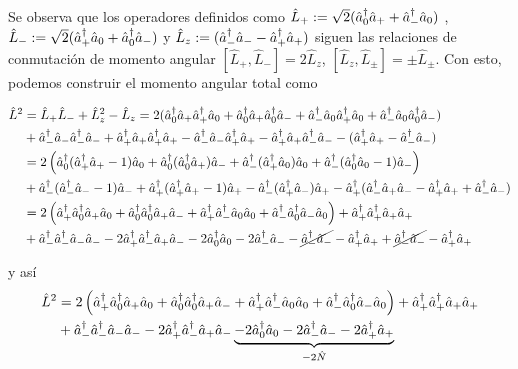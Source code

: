 Se observa que los operadores definidos como $\hat{L}_+ := \sqrt{2}( \crea{0}\anni{+} + \crea{-}\anni{0})$ , $\hat{L}_- := \sqrt{2}( \crea{+}\anni{0} + \crea{0}\anni{-})$ y $\hat{L}_z := ( \crea{-}\anni{-} - \crea{+}\anni{+})$ siguen las relaciones de conmutación de momento angular $\left[ \hat{L}_+, \hat{L}_- \right] = 2\hat{L}_z$, $\left[ \hat{L}_z, \hat{L}_\pm \right] = \pm \hat{L}_\pm$.
Con esto, podemos construir el momento angular total como 


\begin{equation*}
\begin{split}
\hat{L}^2 & = \hat{L}_+\hat{L}_- + \hat{L}_z^2 - \hat{L}_z = 2(  \crea{0}\anni{+}\crea{+}\anni{0} + \crea{0}\anni{+}\crea{0}\anni{-} + \crea{-}\anni{0}\crea{+}\anni{0} + \crea{-}\anni{0}\crea{0}\anni{-}) \\
& + \crea{-}\anni{-}\crea{-}\anni{-} + \crea{+}\anni{+}\crea{+}\anni{+} - \crea{-}\anni{-}\crea{+}\anni{+} - \crea{+}\anni{+}\crea{-}\anni{-} -(\crea{+}\anni{+} -\crea{-}\anni{-}) \\
& = 2\left(  \crea{0}(\crea{+}\anni{+}-1)\anni{0} + \crea{0}(\crea{0}\anni{+})\anni{-} + \crea{-}(\crea{+}\anni{0})\anni{0} + \crea{-}(\crea{0}\anni{0}-1)\anni{-}\right) \\
& + \crea{-}(\crea{-}\anni{-}-1)\anni{-} + \crea{+}(\crea{+}\anni{+}-1)\anni{+} - \crea{-}(\crea{+}\anni{-})\anni{+} - \crea{+}(\crea{-}\anni{+}\anni{-} -\crea{+}\anni{+} + \crea{-}\anni{-}) \\
& = 2\left( \interactt{+}{0}{+}{0} + \interactt{0}{0}{+}{-} +\interactt{+}{-}{0}{0} + \interactt{-}{0}{-}{0}\right) + \interactt{+}{+}{+}{+} \\
& + \interactt{-}{-}{-}{-} -2 \interactt{+}{-}{+}{-} - 2\crea{0}\anni{0} -2\crea{-}\anni{-} -\cancel{\crea{-}\anni{-}} -\crea{+}\anni{+} +\cancel{\crea{-}\anni{-}} -\crea{+}\anni{+}
\end{split}
\end{equation*}

y así
\begin{equation}
\begin{split}
\hat{L}^2 &= 2\left( \interactt{+}{0}{+}{0} + \interactt{0}{0}{+}{-} +\interactt{+}{-}{0}{0} + \interactt{-}{0}{-}{0}\right) + \interactt{+}{+}{+}{+} \\
& + \interactt{-}{-}{-}{-} -2 \interactt{+}{-}{+}{-}  \underbrace{- 2\crea{0}\anni{0} -2\crea{-}\anni{-}  -2\crea{+}\anni{+}}_{-2\hat{N}} 
\end{split}
\end{equation}
\label{lsqrd}

